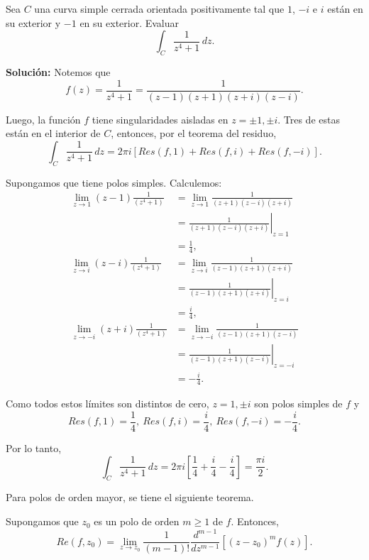 \begin{ejemplo}
Sea $C$ una curva simple cerrada orientada positivamente tal que $1$, $-i$ e $i$ están en su exterior y $-1$ en su exterior. Evaluar
$$\int_C \frac{1}{z^4+1} \,dz.$$

\textbf{Solución:} Notemos que
$$f(z) = \frac{1}{z^4+1} = \frac{1}{(z-1)(z+1)(z+i)(z-i)}.$$

Luego, la función $f$ tiene singularidades aisladas en $z = \pm 1, \pm i$. Tres de estas están en el interior de $C$, entonces, por el teorema del residuo,
$$\int_C \frac{1}{z^4+1} \,dz = 2\pi i \left[ Res(f,1) + Res(f,i) + Res(f,-i)\right].$$

Supongamos que tiene polos simples. Calculemos:
\begin{align*}
    \lim_{z\to 1} (z-1) \frac{1}{(z^4+1)}&= \lim_{z\to 1} \frac{1}{(z+1)(z-i)(z+i)} \\
    &= \left. \frac{1}{(z+1)(z-i)(z+i)} \right|_{z=1} \\
    &= \frac{1}{4}, \\
    \lim_{z\to i} (z-i) \frac{1}{(z^4+1)}&= \lim_{z\to i} \frac{1}{(z-1)(z+1)(z+i)} \\
    &= \left. \frac{1}{(z-1)(z+1)(z+i)} \right|_{z=i} \\
    &= \frac{i}{4} , \\
     \lim_{z\to -i} (z+i) \frac{1}{(z^4+1)}&= \lim_{z\to -i} \frac{1}{(z-1)(z+1)(z-i)} \\
    &= \left. \frac{1}{(z-1)(z+1)(z-i)} \right|_{z=-i} \\
    &= -\frac{i}{4}. 
\end{align*}

Como todos estos límites son distintos de cero, $z = 1,\pm i$ son polos simples de $f$ y
$$Res(f,1) = \frac{1}{4},~ Res(f,i) = \frac{i}{4}, ~ Res(f,-i) = - \frac{i}{4}.$$

Por lo tanto,
$$\int_C \frac{1}{z^4+1} \,dz = 2\pi i \left[ \frac{1}{4} + \frac{i}{4} - \frac{i}{4}\right] = \frac{\pi i}{2}.$$
\end{ejemplo}

Para polos de orden mayor, se tiene el siguiente teorema.

\begin{teorema}
Supongamos que $z_0$ es un polo de orden $m \geq 1$ de $f$. Entonces,
$$Re(f,z_0) = \lim_{z\to z_0} \frac{1}{(m-1)!} \frac{d^{m-1}}{dz^{m-1}}[(z-z_0)^m f(z)].$$
\end{teorema}

